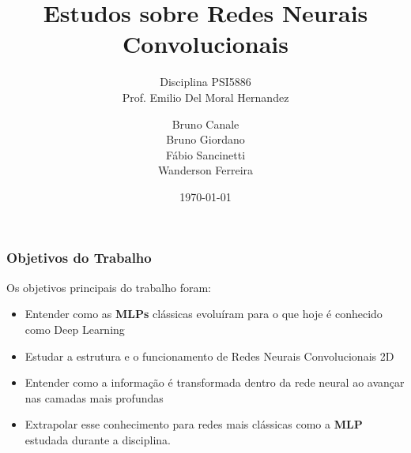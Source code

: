 \documentclass[tikz,10pt]{beamer}
\begin{document}
	\author{Bruno Canale \\ Bruno Giordano \\ Fábio Sancinetti \\
		Wanderson Ferreira}
	\title{Estudos sobre Redes Neurais Convolucionais}
	\subtitle{Disciplina PSI5886 \\ Prof. Emilio Del
		Moral Hernandez}
	\date{\today}
	\maketitle
	\begin{frame}
		\frametitle{Objetivos do Trabalho}
		
		Os objetivos principais do trabalho foram:
		
		\begin{itemize}
			\item Entender como as \textbf{MLPs} clássicas evoluíram para o que hoje é conhecido como Deep Learning
			\item Estudar a estrutura e o funcionamento de Redes Neurais
			Convolucionais 2D
			\item Entender como a informação é transformada dentro da
			rede neural ao avançar nas camadas mais profundas
			\item Extrapolar esse conhecimento para redes mais
			clássicas como a \textbf{MLP} estudada durante a
			disciplina.
		\end{itemize}
	\end{frame}
	
\end{document}
